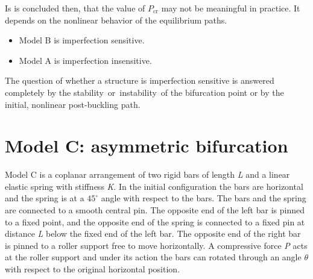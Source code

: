 \documentclass{AeroStructure-ERJohnson}
\begin{document}
Is is concluded then, that the value of $P_{\mathrm{cr}}$ may not be meaningful in practice. It depends on the nonlinear behavior of the equilibrium paths.
\begin{itemize}
  \item Model B is imperfection sensitive.
  \item Model A is imperfection insensitive.
\end{itemize}

\clearpage

The question of whether a structure is imperfection sensitive is answered completely by the stability~or~in\-stability~of the bifurcation point or by the initial, nonlinear post-buckling path.

\section{Model C: asymmetric bifurcation}\label{sec10.3}

Model C is a coplanar arrangement of two rigid bars of length \textit{L} and a linear elastic spring with stiffness \textit{K}. In the initial configuration the bars are horizontal and the spring is at a $45^{\circ}$ angle with respect to the bars. The bars and the spring are connected to a smooth central pin. The opposite end of the left bar is pinned to a fixed point, and the opposite end of the spring is connected to a fixed pin at distance \textit{L} below the fixed end of the left bar. The opposite end of the right bar is pinned to a roller support free to move horizontally. A compressive force \textit{P} acts at the roller support and under its action the bars can rotated through an angle $\theta$ with respect to the original horizontal position.

{\def\thefigure{10.17}
}
\end{document}
